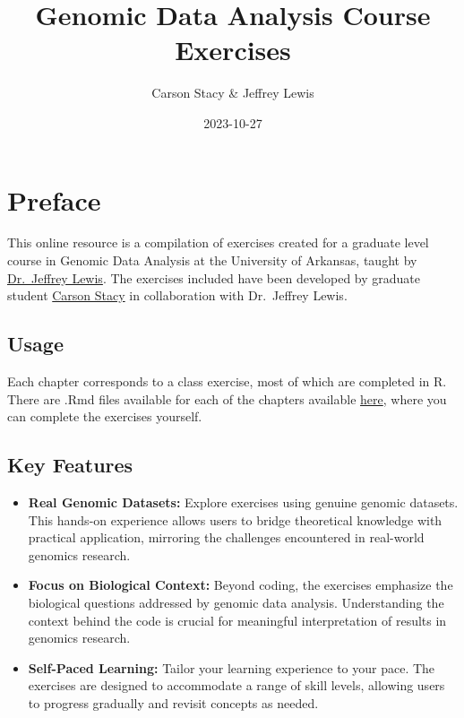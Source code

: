 \documentclass[
]{book}
\title{Genomic Data Analysis Course Exercises}
\author{Carson Stacy \& Jeffrey Lewis}
\date{2023-10-27}
\providecommand{\tightlist}{%
  \setlength{\itemsep}{0pt}\setlength{\parskip}{0pt}}
\begin{document}
\maketitle

{
\setcounter{tocdepth}{1}
\tableofcontents
}
\hypertarget{preface}{%
\chapter*{Preface}\label{preface}}

This online resource is a compilation of exercises created for a graduate level course in Genomic Data Analysis at the University of Arkansas, taught by \href{thelewislab.com}{Dr.~Jeffrey Lewis}. The exercises included have been developed by graduate student \href{clstacy.github.io}{Carson Stacy} in collaboration with Dr.~Jeffrey Lewis.

\hypertarget{usage}{%
\section{Usage}\label{usage}}

Each chapter corresponds to a class exercise, most of which are completed in R. There are .Rmd files available for each of the chapters available \href{https://github.com/clstacy/GenomicDataAnalysis_Fa23/tree/main/exercises}{here}, where you can complete the exercises yourself.

\hypertarget{key-features}{%
\section{\texorpdfstring{\textbf{Key Features}}{Key Features}}\label{key-features}}

\begin{itemize}
\item
  \textbf{Real Genomic Datasets:} Explore exercises using genuine genomic datasets. This hands-on experience allows users to bridge theoretical knowledge with practical application, mirroring the challenges encountered in real-world genomics research.
\item
  \textbf{Focus on Biological Context:} Beyond coding, the exercises emphasize the biological questions addressed by genomic data analysis. Understanding the context behind the code is crucial for meaningful interpretation of results in genomics research.
\end{itemize}

\begin{itemize}
\tightlist
\item
  \textbf{Self-Paced Learning:} Tailor your learning experience to your pace. The exercises are designed to accommodate a range of skill levels, allowing users to progress gradually and revisit concepts as needed.
\end{itemize}
\end{document}
